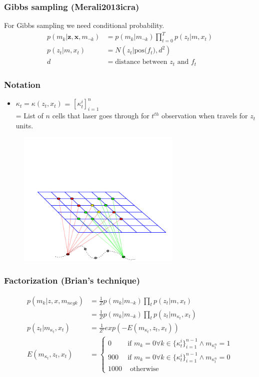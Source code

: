 \documentclass{beamer}
\begin{document}
\begin{frame}
  \frametitle{Gibbs sampling (Merali2013icra)}
  For Gibbs sampling we need conditional probability.
  \begin{align}
    p(m_k|\mathbf{z},\mathbf{x}, m_{\neg k}) &= p(m_k|m_{\neg k})\prod_{t=0}^{T}p(z_t|m, x_t)\\
                               p(z_t|m, x_t) &= N(z_t|\text{pos($f_t$)}, d^2)\\
                                           d &= \text{distance between $z_t$ and $f_t$}
  \end{align}
\end{frame}
\begin{frame}
  \frametitle{Notation}
  \begin{itemize}
      \item $\kappa_t = \kappa(z_t, x_t)$ = $[\kappa^i_t]_{i=1}^{n}$ \\
        = List of $n$ cells that laser goes through for $t^{th}$ observation when travels for $z_t$ units.
  \end{itemize}
  \begin{figure}
    \includegraphics[trim=0in 0in 0in 2in, width=0.7\textwidth]{figures/factorgraph/fg3.pdf}
  \end{figure}
\end{frame}
\begin{frame}
  \frametitle{Factorization (Brian's technique)}
  \begin{align}
    p(m_k|z, x, m_{neg k}) &= \frac{1}{Z} p(m_k|m_{\neg k}) \prod_t p(z_t|m, x_t)\\
                           &= \frac{1}{Z} p(m_k|m_{\neg k}) \prod_t p(z_t|m_{\kappa_t}, x_t)\\
  p(z_t|m_{\kappa_t}, x_t) &= \frac{1}{Z'}exp(-E(m_{\kappa_t}, z_t, x_t))\\
  E(m_{\kappa_t}, z_t, x_t) &= \begin{cases}
              0 & \text{if $m_{k} = 0 \forall k \in \{\kappa^i_t\}_{i=1}^{n-1} \land m_{\kappa_t^n} = 1$}\\
            900 & \text{if $m_{k} = 0 \forall k \in \{\kappa^i_t\}_{i=1}^{n-1} \land m_{\kappa_t^n} = 0$}\\
           1000 & \text{ otherwise}
    \end{cases}
  \end{align}

\end{frame}
\end{document}

